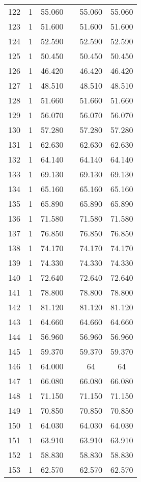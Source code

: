 \begin{table}[!htbp]
\begin{tabular}{@{\extracolsep{5pt}}lccccc}
122 & 1 & 55.060 &  & 55.060 & 55.060 \\ 
123 & 1 & 51.600 &  & 51.600 & 51.600 \\ 
124 & 1 & 52.590 &  & 52.590 & 52.590 \\ 
125 & 1 & 50.450 &  & 50.450 & 50.450 \\ 
126 & 1 & 46.420 &  & 46.420 & 46.420 \\ 
127 & 1 & 48.510 &  & 48.510 & 48.510 \\ 
128 & 1 & 51.660 &  & 51.660 & 51.660 \\ 
129 & 1 & 56.070 &  & 56.070 & 56.070 \\ 
130 & 1 & 57.280 &  & 57.280 & 57.280 \\ 
131 & 1 & 62.630 &  & 62.630 & 62.630 \\ 
132 & 1 & 64.140 &  & 64.140 & 64.140 \\ 
133 & 1 & 69.130 &  & 69.130 & 69.130 \\ 
134 & 1 & 65.160 &  & 65.160 & 65.160 \\ 
135 & 1 & 65.890 &  & 65.890 & 65.890 \\ 
136 & 1 & 71.580 &  & 71.580 & 71.580 \\ 
137 & 1 & 76.850 &  & 76.850 & 76.850 \\ 
138 & 1 & 74.170 &  & 74.170 & 74.170 \\ 
139 & 1 & 74.330 &  & 74.330 & 74.330 \\ 
140 & 1 & 72.640 &  & 72.640 & 72.640 \\ 
141 & 1 & 78.800 &  & 78.800 & 78.800 \\ 
142 & 1 & 81.120 &  & 81.120 & 81.120 \\ 
143 & 1 & 64.660 &  & 64.660 & 64.660 \\ 
144 & 1 & 56.960 &  & 56.960 & 56.960 \\ 
145 & 1 & 59.370 &  & 59.370 & 59.370 \\ 
146 & 1 & 64.000 &  & 64 & 64 \\ 
147 & 1 & 66.080 &  & 66.080 & 66.080 \\ 
148 & 1 & 71.150 &  & 71.150 & 71.150 \\ 
149 & 1 & 70.850 &  & 70.850 & 70.850 \\ 
150 & 1 & 64.030 &  & 64.030 & 64.030 \\ 
151 & 1 & 63.910 &  & 63.910 & 63.910 \\ 
152 & 1 & 58.830 &  & 58.830 & 58.830 \\ 
153 & 1 & 62.570 &  & 62.570 & 62.570 \\ 

\end{tabular}
\end{table}
